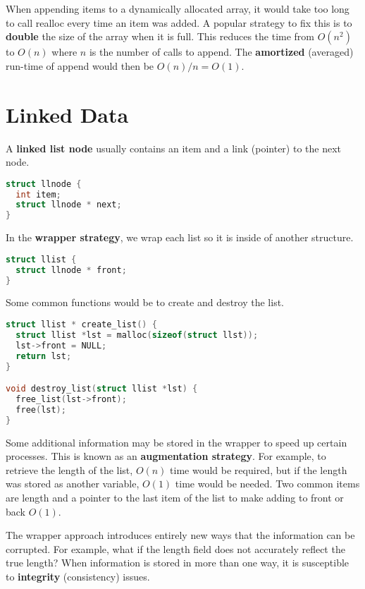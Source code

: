 \documentclass[english, 12pt]{article}
\begin{document}
\begin{note}
When appending items to a dynamically allocated array, it would take too long to call realloc every time an item was added. A popular strategy to fix this is to \textbf{double} the size of the array when it is full. This reduces the time from $O(n^2)$ to $O(n)$ where $n$ is the number of calls to append.\n
The \textbf{amortized} (averaged) run-time of append would then be $O(n)/n = O(1)$.
\end{note}

\section{Linked Data}

\begin{defn}
A \textbf{linked list node} usually contains an item and a link (pointer) to the next node.
\begin{lstlisting}[language=C]
struct llnode {
  int item;
  struct llnode * next;
}
\end{lstlisting}
\end{defn}

\begin{defn}
In the \textbf{wrapper strategy}, we wrap each list so it is inside of another structure.
\begin{lstlisting}[language=C]
struct llist {
  struct llnode * front;
}
\end{lstlisting}
Some common functions would be to create and destroy the list.
\begin{lstlisting}[language=C]
struct llist * create_list() {
  struct llist *lst = malloc(sizeof(struct llst));
  lst->front = NULL;
  return lst;
}

void destroy_list(struct llist *lst) {
  free_list(lst->front);
  free(lst);
}
\end{lstlisting}
Some additional information may be stored in the wrapper to speed up certain processes. This is known as an \textbf{augmentation strategy}. For example, to retrieve the length of the list, $O(n)$ time would be required, but if the length was stored as another variable, $O(1)$ time would be needed. Two common items are length and a pointer to the last item of the list to make adding to front or back $O(1)$.
\end{defn}

\begin{note}
The wrapper approach introduces entirely new ways that the information can be corrupted. For example, what if the length field does not accurately reflect the true length?\n
When information is stored in more than one way, it is susceptible to \textbf{integrity} (consistency) issues.
\end{note}
\end{document}
